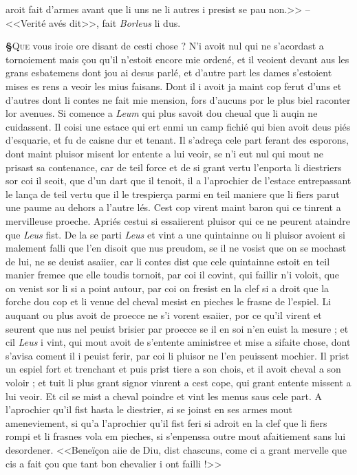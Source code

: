 \documentclass[12pt]{article} %
\newcommand{\colmar}[1]{\marginnote{[#1]}}          %
\newcommand{\persName}[1]{\emph{#1}} %
\newcommand{\supplied}[1]{\textlangle#1\textrangle} %
\newcounter{paranum}
\newcommand{\pnum}{\stepcounter{paranum}\textbf{§\arabic{paranum}}\quad}
\begin{document}
aroit fait d'armes avant que li uns ne li autres i presist se pau non.>> -- <<Verité avés dit>>, fait \persName{Borleus} li dus.


\pnum \lettrine[lines=2]{\color{darkred}Q}{ue} vous iroie ore disant de cesti chose ? N'i avoit nul qui ne s'acordast a tornoiement mais çou qu'il n'estoit encore mie ordené, et il veoient devant aus les grans esbatemens dont jou ai desus parlé, et d'autre part les dames s'estoient mises es rens a veoir les mius faisans. Dont il i avoit ja maint cop ferut d'uns et d'autres dont li contes ne fait mie mension, fors d'aucuns por le plus biel raconter lor avenues. Si comence a \persName{Leum} qui plus savoit dou cheual que li auqin ne cuidassent. Il coisi une estace qui ert enmi un camp fichié qui bien avoit deus piés d'esquarie, et fu de caisne dur et tenant. Il s'adreça cele part ferant des esporons, dont maint p\supplied{l}uisor misent lor entente a lui veoir, se n'i eut nul qui mout ne prisast sa contenance, car de teil force et de si grant vertu l'enporta li diestriers sor coi il seoit, que d'un dart que il tenoit, il a l'aprochier de l'estace entrepassant le lança de teil vertu que il le trespierça parmi en teil maniere que li fiers parut une paume au dehors a l'autre lés. Cest cop virent maint baron qui ce tinrent a mervilleuse proeche. Apriés cestui si essaiierent pluisor qui ce ne peurent ataindre que \persName{Leus} fist. De la se parti \persName{Leus} et vint a une quintainne ou li pluisor avoient si malement falli que l'en disoit que nus preudom, se il ne vosist que on se mochast de lui, ne se deuist asaiier, car li contes dist que cele quintainne estoit en teil manier fremee que elle toudis tornoit, par coi il covint, qui faillir n'i voloit, que on venist sor li si a point autour, par coi on fresist en la clef si a droit que la forche dou cop et li venue del cheval mesist en pieches le frasne de l'espiel. Li auquant ou plus avoit de proecce ne s'i vorent esaiier, por ce qu'il virent et seurent que nus nel peuist brisier par proecce se il en soi n'en euist la mesure ; et cil \persName{Leus} i vint, qui mout avoit de s'entente aministree et mise a sifaite chose, dont s'avisa coment il i peuist ferir, par coi li pluisor ne l'en peuissent mochier. Il prist un espiel fort et trenchant et puis prist tiere a son chois, et il avoit cheval a son voloir ; et tuit li plus grant signor vinrent a cest cope, qui grant entente missent a lui veoir. Et cil se mist a cheval poindre et vint les menus saus cele part. A l'aprochier qu'il fist hasta le diestrier, si se joinst en ses armes mout ameneviement, si q\supplied{u}'a l'aprochier qu'il fist feri si adroit en la clef que li fiers rompi et li frasnes \colmar{4rb}\colmar{b} vola em pieches, si s'enpenssa outre mout afaitiement sans lui desordener. <<Beneïçon aiie de Diu, dist chascuns, come ci a grant mervelle que cis a fait çou que tant bon chevalier i ont failli !>>
\end{document}
